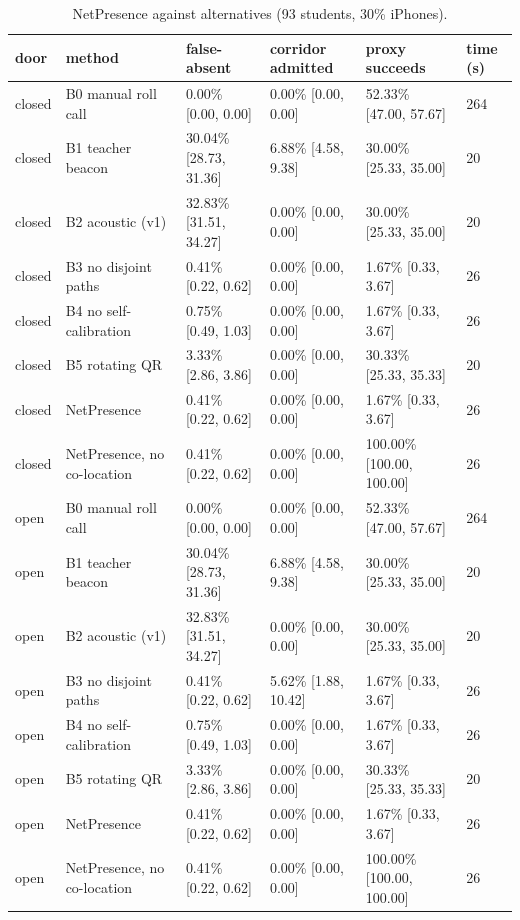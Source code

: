 \begin{table}[t]
\centering
\caption{NetPresence against alternatives (93 students, 30\% iPhones).}\label{tab:e09}
\begin{tabular}{llllll}
\toprule
door & method & false-absent & corridor admitted & proxy succeeds & time (s) \\
\midrule
closed & B0 manual roll call & 0.00\% [0.00, 0.00] & 0.00\% [0.00, 0.00] & 52.33\% [47.00, 57.67] & 264 \\
closed & B1 teacher beacon & 30.04\% [28.73, 31.36] & 6.88\% [4.58, 9.38] & 30.00\% [25.33, 35.00] & 20 \\
closed & B2 acoustic (v1) & 32.83\% [31.51, 34.27] & 0.00\% [0.00, 0.00] & 30.00\% [25.33, 35.00] & 20 \\
closed & B3 no disjoint paths & 0.41\% [0.22, 0.62] & 0.00\% [0.00, 0.00] & 1.67\% [0.33, 3.67] & 26 \\
closed & B4 no self-calibration & 0.75\% [0.49, 1.03] & 0.00\% [0.00, 0.00] & 1.67\% [0.33, 3.67] & 26 \\
closed & B5 rotating QR & 3.33\% [2.86, 3.86] & 0.00\% [0.00, 0.00] & 30.33\% [25.33, 35.33] & 20 \\
closed & NetPresence & 0.41\% [0.22, 0.62] & 0.00\% [0.00, 0.00] & 1.67\% [0.33, 3.67] & 26 \\
closed & NetPresence, no co-location & 0.41\% [0.22, 0.62] & 0.00\% [0.00, 0.00] & 100.00\% [100.00, 100.00] & 26 \\
open & B0 manual roll call & 0.00\% [0.00, 0.00] & 0.00\% [0.00, 0.00] & 52.33\% [47.00, 57.67] & 264 \\
open & B1 teacher beacon & 30.04\% [28.73, 31.36] & 6.88\% [4.58, 9.38] & 30.00\% [25.33, 35.00] & 20 \\
open & B2 acoustic (v1) & 32.83\% [31.51, 34.27] & 0.00\% [0.00, 0.00] & 30.00\% [25.33, 35.00] & 20 \\
open & B3 no disjoint paths & 0.41\% [0.22, 0.62] & 5.62\% [1.88, 10.42] & 1.67\% [0.33, 3.67] & 26 \\
open & B4 no self-calibration & 0.75\% [0.49, 1.03] & 0.00\% [0.00, 0.00] & 1.67\% [0.33, 3.67] & 26 \\
open & B5 rotating QR & 3.33\% [2.86, 3.86] & 0.00\% [0.00, 0.00] & 30.33\% [25.33, 35.33] & 20 \\
open & NetPresence & 0.41\% [0.22, 0.62] & 0.00\% [0.00, 0.00] & 1.67\% [0.33, 3.67] & 26 \\
open & NetPresence, no co-location & 0.41\% [0.22, 0.62] & 0.00\% [0.00, 0.00] & 100.00\% [100.00, 100.00] & 26 \\
\bottomrule
\end{tabular}
\end{table}
